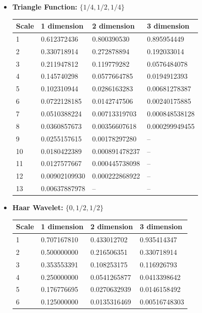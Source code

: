 \documentclass[12pt,a4paper]{article}
\begin{document}
\begin{itemize}
\item \textbf{Triangle Function:} $\{1/4,1/2,1/4\}$

\begin{tabular}{llll}
Scale & 1 dimension      & 2 dimension     & 3 dimension\\ \hline
1     & 0.612372436      & 0.800390530     & 0.895954449  \\
2     & 0.330718914	 & 0.272878894     & 0.192033014\\
3     & 0.211947812	 & 0.119779282     & 0.0576484078\\
4     & 0.145740298	 & 0.0577664785    & 0.0194912393\\
5     & 0.102310944	 & 0.0286163283    & 0.00681278387\\
6     & 0.0722128185	 & 0.0142747506    & 0.00240175885\\
7     & 0.0510388224	 & 0.00713319703   & 0.000848538128 \\
8     & 0.0360857673	 & 0.00356607618   & 0.000299949455 \\
9     & 0.0255157615	 & 0.00178297280   & -- \\
10    & 0.0180422389	 & 0.000891478237  & --  \\
11    & 0.0127577667	 & 0.000445738098  & --  \\
12    & 0.00902109930	 & 0.000222868922  & --  \\
13    & 0.00637887978	 & --		   & -- \\

\end{tabular}

\item \textbf{Haar Wavelet:} $\{0,1/2,1/2\}$

\begin{tabular}{llll}
Scale & 1 dimension      & 2 dimension     & 3 dimension\\ \hline
1     & 0.707167810      & 0.433012702     & 0.935414347 \\
2     & 0.500000000	 & 0.216506351     & 0.330718914\\
3     & 0.353553391	 & 0.108253175     & 0.116926793\\
4     & 0.250000000	 & 0.0541265877    & 0.0413398642\\
5     & 0.176776695	 & 0.0270632939    & 0.0146158492\\
6     & 0.125000000	 & 0.0135316469    & 0.00516748303

\end{tabular}


\end{itemize}
\end{document}
